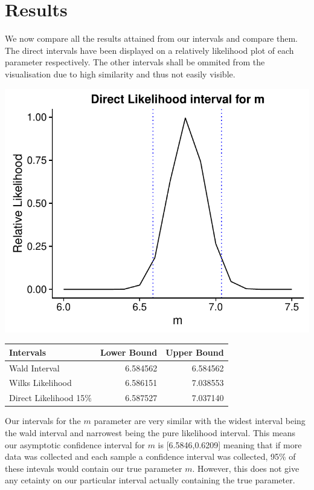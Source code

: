\documentclass[11pt,preprint, authoryear]{elsarticle}
\let\origtable\table
\let\endorigtable\endtable
\renewenvironment{table}[1][2] {
    \expandafter\origtable\expandafter[H]
} {
    \endorigtable
}
\numberwithin{equation}{section}
\numberwithin{figure}{section}
\numberwithin{table}{section}
\begin{document}
\section{Results}\label{results}

We now compare all the results attained from our intervals and compare
them. The direct intervals have been displayed on a relatively
likelihood plot of each parameter respectively. The other intervals
shall be ommited from the visualisation due to high similarity and thus
not easily visible.

\includegraphics{likelihood_files/figure-latex/unnamed-chunk-10-1.pdf}

\begin{table}

\caption{\label{tab:intervals}Intervals for m parameter}
\centering
\begin{tabular}[t]{lrr}
\toprule
Intervals & Lower Bound & Upper Bound\\
\midrule
Wald Interval & 6.584562 & 6.584562\\
Wilks Likelihood & 6.586151 & 7.038553\\
Direct Likelihood 15\% & 6.587527 & 7.037140\\
\bottomrule
\end{tabular}
\end{table}

Our intervals for the \(m\) parameter are very similar with the widest
interval being the wald interval and narrowest being the pure likelihood
interval. This means our asymptotic confidence interval for \(m\) is
{[}6.5846,0.6209{]} meaning that if more data was collected and each
sample a confidence interval was collected, 95\% of these intevals would
contain our true parameter \(m\). However, this does not give any
cetainty on our particular interval actually containing the true
parameter.
\end{document}
